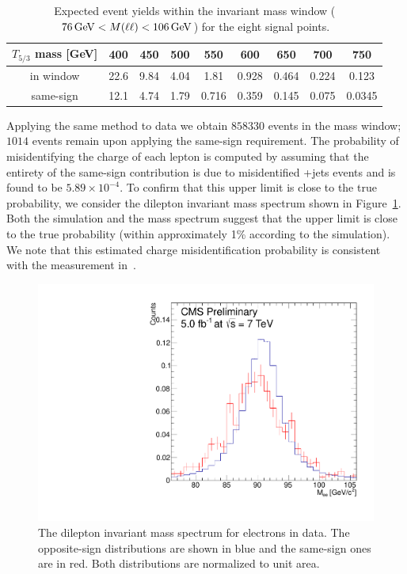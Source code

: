 \begin{table}[htb]
    \centering
\begin{tabular}{*9c}
    \toprule
$T_{5/3}$ mass [GeV]  & 400       & 450       & 500       & 550       & 600       & 650       & 700       & 750       \\ 
\midrule
 in \Z window         & 22.6      & 9.84      & 4.04      & 1.81      & 0.928     & 0.464     & 0.224     & 0.123     \\ 
 same-sign           & 12.1      & 4.74      & 1.79      & 0.716     & 0.359     & 0.145     & 0.075     & 0.0345    \\ 
 \bottomrule
\end{tabular}
\caption{Expected event yields within the \Z invariant mass window
    ($\unit[76]{GeV}< M(\Lep \Lep) <\unit[106]{GeV}$) for the eight \TP signal  points.}
\label{tab:ZWindowSig}
\end{table}


Applying the same method to data we obtain $858330$ events in the \Z mass
window; $1014$ events remain upon applying the same-sign requirement. The probability of misidentifying the charge of each 
lepton is computed by assuming that the entirety of the same-sign contribution is due to misidentified \Z+jets events and is found to be $5.89 \times 10^{-4}$. To confirm that this upper limit is close to the true probability, we consider the dilepton invariant mass spectrum shown in Figure~\ref{fig:ZWindowMassPeak}. Both 
the simulation and the mass spectrum suggest that the upper limit is close
to the true probability (within approximately 1\% according to the
simulation). We note that this  estimated charge misidentification
probability is consistent with the measurement in~\cite{susy2011}.

\begin{figure}[htb]
\centering
\includegraphics[width=\textwidth]{images/pdf/ChargeMisID_ZMass.pdf}
\caption{The dilepton invariant mass spectrum for electrons in data. The opposite-sign distributions are shown in blue and 
the same-sign ones are in red. Both distributions are normalized to unit area.}
\label{fig:ZWindowMassPeak}
\end{figure}

